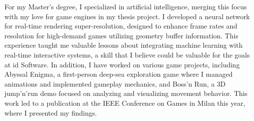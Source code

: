 For my Master’s degree, 
I specialized in artificial intelligence, 
merging this focus with my love for game engines in my thesis project. 
I developed a neural network for real-time rendering super-resolution, 
designed to enhance frame rates and resolution for high-demand games utilizing geometry buffer information. 
This experience taught me valuable lessons about integrating machine learning with real-time interactive systems, 
a skill that I believe could be valuable for the goals at id Software.
In addition, I have worked on various game projects, 
including Abyssal Enigma, a first-person deep-sea exploration game where I managed animations 
and implemented gameplay mechanics, 
and Boss’n Run, a 3D jump’n’run demo focused on analyzing and visualizing movement behavior. 
This work led to a publication at the IEEE Conference on Games in Milan this year, where I presented my findings.